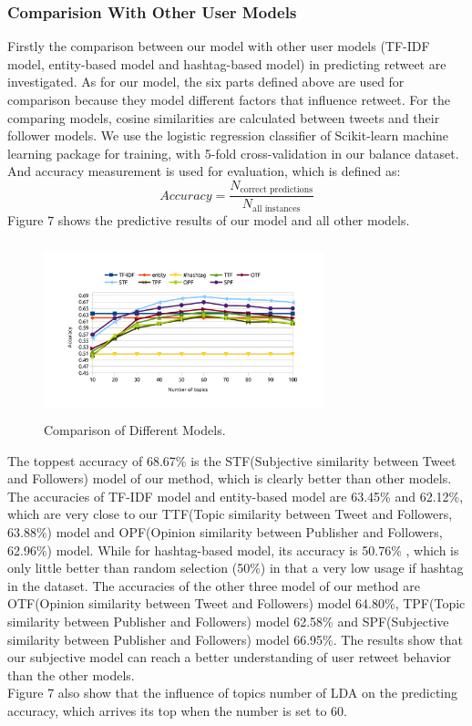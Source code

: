 \documentclass{acm_proc_article-sp}
\begin{document}
\subsubsection{Comparision With Other User Models}
Firstly the comparison between our model with other user models (TF-IDF model\cite{Luo:2013Sig}, entity-based model and hashtag-based model\cite{Abel:2011AUM}) in predicting retweet are investigated.
As for our model, the six parts defined above are used for comparison because they model different factors that influence retweet.
For the comparing models, cosine similarities are calculated between tweets and their follower models.
We use the logistic regression classifier of Scikit-learn machine learning package\cite{scikit-learn} for training, with 5-fold cross-validation in our balance dataset.
And accuracy measurement is used for evaluation, which is defined as:
\begin{equation}
Accuracy=\dfrac{N_{\text{correct predictions}}}{N_{\text{all instances}}}
\end{equation}
Figure 7 shows the predictive results of our model and all other models.
\begin{figure}
\centering
\includegraphics[width=3.2in,height=2.0in]{comparison.pdf}
\caption{Comparison of Different Models.}
\label{fig:graph7}
\end{figure}
The toppest accuracy of 68.67\% is the STF(Subjective similarity between Tweet and Followers) model of our method, which is clearly better than other models. 
The accuracies of TF-IDF model and entity-based model are 63.45\% and 62.12\%, which are very close to our TTF(Topic similarity between Tweet and Followers, 63.88\%) model and OPF(Opinion similarity between Publisher and Followers, 62.96\%) model.
While for hashtag-based model, its accuracy is  50.76\% , which is only little better than random selection (50\%) in that a very low usage if hashtag in the dataset.
The accuracies of the other three model of our method are OTF(Opinion similarity between Tweet and Followers) model 64.80\%, TPF(Topic similarity between Publisher and Followers) model 62.58\% and SPF(Subjective similarity between Publisher and Followers) model 66.95\%.
The results show that our subjective model can reach a better understanding of user retweet behavior than the other models.\\
Figure 7 also show that the influence of topics number of LDA on the predicting accuracy, which arrives its top when the number is set to 60.
\end{document}

